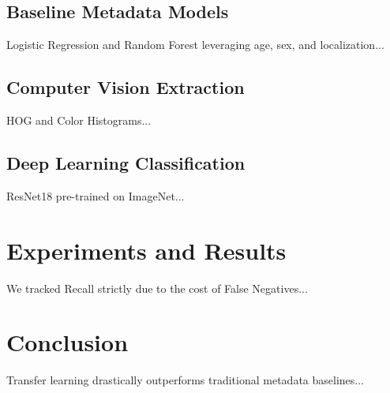 \documentclass[conference]{IEEEtran}
\begin{document}
\subsection{Baseline Metadata Models}
Logistic Regression and Random Forest leveraging age, sex, and localization...

\subsection{Computer Vision Extraction}
HOG and Color Histograms...

\subsection{Deep Learning Classification}
ResNet18 pre-trained on ImageNet...

\section{Experiments and Results}
We tracked Recall strictly due to the cost of False Negatives...

\section{Conclusion}
Transfer learning drastically outperforms traditional metadata baselines...
\end{document}
